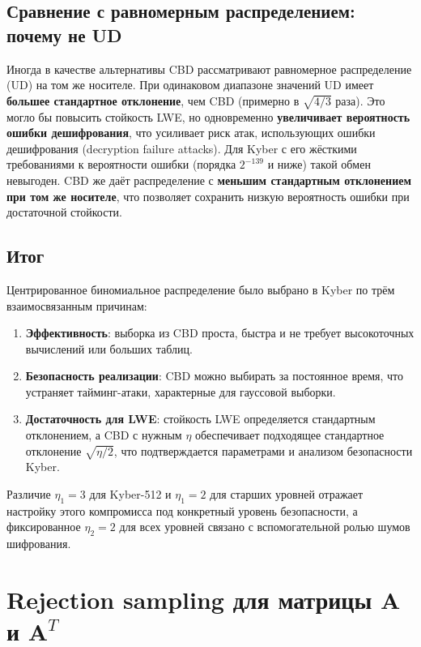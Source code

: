 \documentclass[11pt,a4paper]{article}
\begin{document}
\subsection{Сравнение с равномерным распределением: почему не UD}

Иногда в качестве альтернативы CBD рассматривают равномерное распределение (UD) на том же носителе. При одинаковом диапазоне значений UD имеет \textbf{большее стандартное отклонение}, чем CBD (примерно в \(\sqrt{4/3}\) раза). Это могло бы повысить стойкость LWE, но одновременно \textbf{увеличивает вероятность ошибки дешифрования}, что усиливает риск атак, использующих ошибки дешифрования (decryption failure attacks). Для Kyber с его жёсткими требованиями к вероятности ошибки (порядка \(2^{-139}\) и ниже) такой обмен невыгоден. CBD же даёт распределение с \textbf{меньшим стандартным отклонением при том же носителе}, что позволяет сохранить низкую вероятность ошибки при достаточной стойкости.

\subsection{Итог}

Центрированное биномиальное распределение было выбрано в Kyber по трём взаимосвязанным причинам:
\begin{enumerate}
    \item \textbf{Эффективность}: выборка из CBD проста, быстра и не требует высокоточных вычислений или больших таблиц.
    \item \textbf{Безопасность реализации}: CBD можно выбирать за постоянное время, что устраняет тайминг-атаки, характерные для гауссовой выборки.
    \item \textbf{Достаточность для LWE}: стойкость LWE определяется стандартным отклонением, а CBD с нужным \(\eta\) обеспечивает подходящее стандартное отклонение \(\sqrt{\eta/2}\), что подтверждается параметрами и анализом безопасности Kyber.
\end{enumerate}
Различие \(\eta_1=3\) для Kyber-512 и \(\eta_1=2\) для старших уровней отражает настройку этого компромисса под конкретный уровень безопасности, а фиксированное \(\eta_2=2\) для всех уровней связано с вспомогательной ролью шумов шифрования.

\newpage
\section{Rejection sampling для матрицы \(\mathbf{A}\) и \(\mathbf{A}^T\)}
\end{document}
